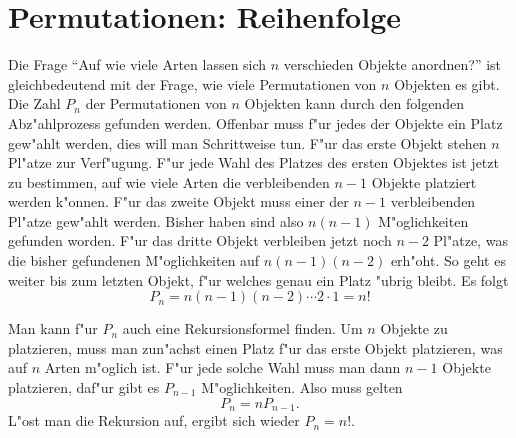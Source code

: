 \section{Permutationen: Reihenfolge} \label{kombinatorik-permutation}
Die Frage ``Auf wie viele Arten lassen sich $n$ verschieden Objekte anordnen?''
ist gleichbedeutend mit der Frage, wie viele Permutationen von $n$
Objekten es gibt.
Die Zahl  $P_n$ der Permutationen von $n$ Objekten
kann durch den folgenden Abz"ahlprozess gefunden werden.
Offenbar muss f"ur jedes der Objekte ein Platz gew"ahlt werden, dies will
man Schrittweise tun.
F"ur das erste Objekt stehen $n$ Pl"atze
zur Verf"ugung.
F"ur jede Wahl des Platzes des ersten Objektes 
ist jetzt zu bestimmen, auf wie viele Arten die verbleibenden
$n-1$ Objekte platziert werden k"onnen.
F"ur das zweite
Objekt muss einer der $n-1$ verbleibenden Pl"atze gew"ahlt werden.
Bisher haben sind also $n(n-1)$ M"oglichkeiten gefunden worden.
F"ur das dritte Objekt verbleiben jetzt noch $n-2$ Pl"atze,
was die bisher gefundenen M"oglichkeiten auf $n(n-1)(n-2)$
erh"oht.
So geht es weiter bis zum letzten Objekt, f"ur welches
genau ein Platz "ubrig bleibt.
Es folgt
\[
P_n=n(n-1)(n-2)\dotsm 2\cdot 1=n!
\]

Man kann f"ur $P_n$ auch eine Rekursionsformel finden.
Um $n$ Objekte
zu platzieren, muss man zun"achst einen Platz f"ur das erste Objekt
platzieren, was auf $n$ Arten m"oglich ist.
F"ur jede solche Wahl
muss man dann $n-1$ Objekte platzieren, daf"ur gibt es $P_{n-1}$
M"oglichkeiten.
Also muss gelten
\[
P_n=nP_{n-1}.
\]
L"ost man die Rekursion auf, ergibt sich wieder $P_n=n!$.


